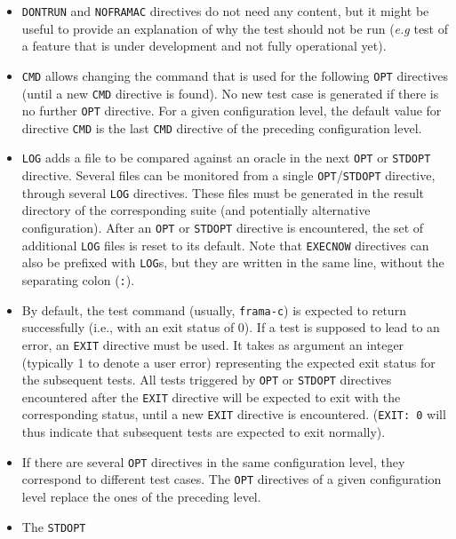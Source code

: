 \begin{itemize}
\item \texttt{DONTRUN} and \texttt{NOFRAMAC} directives
  do not need any content, but it might be
  useful to provide an explanation of why the test should not be run
  ({\it e.g} test of a feature that is under development and not fully
  operational yet).
\item
  \texttt{CMD} allows changing the command that is used for the
  following \texttt{OPT} directives (until a new \texttt{CMD}
  directive is found). No new test case is generated
  if there is no further \texttt{OPT} directive. For a given
  configuration level, the default value for directive
  \texttt{CMD} is the last
  \texttt{CMD} directive of the preceding configuration level.
\item \texttt{LOG} adds a file to be compared against an oracle in the
  next \texttt{OPT} or \texttt{STDOPT} directive. Several files can be
  monitored from a single \texttt{OPT}/\texttt{STDOPT} directive,
  through several \texttt{LOG} directives.
  These files must be generated in the result
  directory of the corresponding suite (and potentially alternative
  configuration).
  After an \texttt{OPT} or \texttt{STDOPT} directive is encountered,
  the set of additional \texttt{LOG} files is reset to its default.
  Note that \texttt{EXECNOW} directives can also be prefixed with
  \texttt{LOG}s, but they are written in the same line, without the
  separating colon (\texttt{:}).
\item By default, the test command (usually, \texttt{frama-c}) is expected
  to return successfully (i.e., with an exit status of 0).
  If a test is supposed to lead to an error, an \texttt{EXIT} directive must be
  used. It takes as argument an integer
  (typically 1 to denote a user error) representing the expected exit status
  for the subsequent tests. All tests triggered by \texttt{OPT} or
  \texttt{STDOPT} directives encountered after the \texttt{EXIT} directive
  will be expected to exit with the corresponding status, until a new
  \texttt{EXIT} directive is encountered. (\texttt{EXIT: 0} will thus
  indicate that subsequent tests are expected to exit normally).
\item If there are several \texttt{OPT} directives in the same
  configuration level, they correspond to different test cases. The
  \texttt{OPT} directives of a given configuration level replace
  the ones of the preceding level.
\item The \texttt{STDOPT}

\end{itemize}
